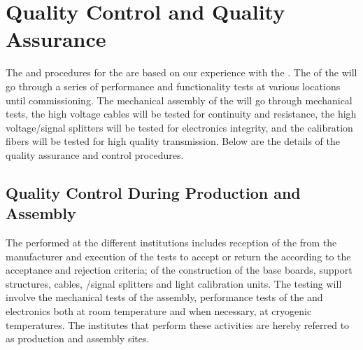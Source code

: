 \section{Quality Control and Quality Assurance}
\label{sec:dp-pds-quality}

The  and  procedures for the \dual {} are based on our experience with the . The  of the \dual {} will go through a series of performance and functionality tests at various locations until commissioning. The mechanical assembly of the  will go through mechanical tests, the high voltage cables will be tested for continuity and resistance, the high voltage/signal splitters will be tested for electronics integrity, and the calibration fibers will be tested for high quality transmission. Below  are the details of the quality assurance and control procedures.

\subsection{Quality Control During Production and Assembly}

The  performed at the different institutions includes reception of the  from the manufacturer and execution of the  tests to accept or return the  according to the acceptance and rejection criteria;  of the construction of the base boards, support structures, cables, /signal splitters and light calibration units. The testing will involve the mechanical tests of the assembly, performance tests of the  and electronics both at room temperature and when necessary, at cryogenic temperatures. The institutes that perform these activities are hereby referred to as production and assembly sites.

